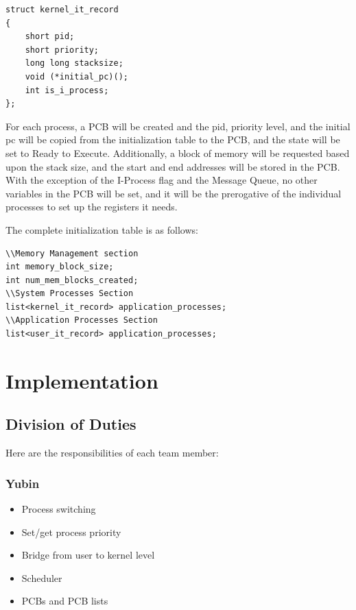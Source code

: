 \documentclass[titlepage]{article}
\begin{document}
\begin{verbatim}
struct kernel_it_record
{
    short pid;
    short priority;
    long long stacksize;
    void (*initial_pc)();
    int is_i_process;
};
\end{verbatim}

For each process, a PCB will be created and the pid, priority level, and the
initial pc will be copied from the initialization table to the PCB, and the
state will be set to Ready to Execute.  Additionally, a block of memory will be
requested based upon the stack size, and the start and end addresses will be
stored in the PCB.  With the exception of the I-Process flag and the Message
Queue, no other variables in the PCB will be set, and it will be the prerogative
of the individual processes to set up the registers it needs.

The complete initialization table is as follows:
\begin{verbatim}
\\Memory Management section
int memory_block_size;
int num_mem_blocks_created;
\\System Processes Section
list<kernel_it_record> application_processes;
\\Application Processes Section
list<user_it_record> application_processes;
\end{verbatim}

\section{Implementation}

\subsection{Division of Duties}
Here are the responsibilities of each team member:

\subsubsection{Yubin}
\begin{itemize}
\setlength{\itemsep}{-1mm}
\item Process switching
\item Set/get process priority
\item Bridge from user to kernel level
\item Scheduler
\item PCBs and PCB lists
\end{itemize}
\end{document}
